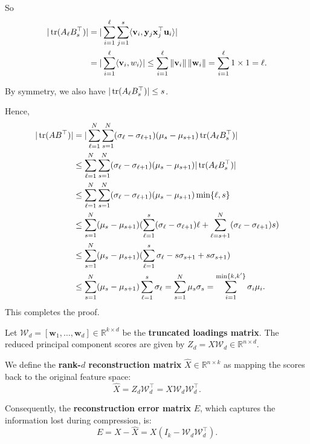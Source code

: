 \documentclass[12pt]{article}
\begin{document}
\begin{pfbox}
So
\begin{align*}
|\operatorname{tr}(A_\ell B_s^\top)|& = |\sum_{i=1}^{\ell}\sum_{j=1}^{s} \langle \mathbf{v}_i, \mathbf{y}_j\mathbf{x}_j^\top \mathbf{u}_i\rangle|\\
& = |\sum_{i=1}^{\ell}\langle \mathbf{v}_i, w_i\rangle|\le \sum_{i=1}^{\ell}\left\lVert \mathbf{v}_i \right\rVert\left\lVert \mathbf{w}_i \right\rVert=\sum_{i=1}^{\ell}1\times 1 = \ell.    
\end{align*}

By symmetry, we also have $|\operatorname{tr}(A_\ell B_s^\top)|\le s$.

Hence,
\begin{align*}
|\operatorname{tr}(AB^\top)|&=|\sum_{\ell=1}^{N}\sum_{s=1}^{N}(\sigma_\ell-\sigma_{\ell+1})(\mu_s-\mu_{s+1})\operatorname{tr}(A_\ell B_s^\top)|\\
&\le \sum_{\ell=1}^{N}\sum_{s=1}^{N}(\sigma_\ell-\sigma_{\ell+1})(\mu_s-\mu_{s+1})|\operatorname{tr}(A_\ell B^\top_s)|\\
&\le\sum_{\ell=1}^{N}\sum_{s=1}^{N}(\sigma_\ell-\sigma_{\ell+1})(\mu_s-\mu_{s+1})\min\{\ell,s\}\\
&\le \sum_{s=1}^{N}(\mu_s-\mu_{s+1})(\sum_{\ell=1}^{s}(\sigma_\ell-\sigma_{\ell+1})\ell + \sum_{\ell=s+1}^{N}(\sigma_\ell-\sigma_{\ell+1})s)\\
&\le \sum_{s=1}^{N}(\mu_s-\mu_{s+1})(\sum_{\ell=1}^{s}\sigma_\ell - s\sigma_{s+1} + s\sigma_{s+1})\\
&\le \sum_{s=1}^{N}(\mu_s-\mu_{s+1})\sum_{\ell=1}^{s}\sigma_\ell = \sum_{s=1}^{N}\mu_s\sigma_s = \sum_{i=1}^{\min\{k,k'\}}\sigma_i\mu_i.
\end{align*}
This completes the proof.
\end{pfbox}


Let $\mathcal{W}_d = [\mathbf{w}_1, \dots, \mathbf{w}_d] \in \mathbb{R}^{k \times d}$ be the \textbf{truncated loadings matrix}. The reduced principal component scores are given by $Z_d = X \mathcal{W}_d \in \mathbb{R}^{n \times d}$.

We define the \textbf{rank-$d$ reconstruction matrix} $\widehat{X}\in\mathbb{R}^{n\times k}$ as mapping the scores back to the original feature space:
\begin{equation}
\widehat{X} = Z_d \mathcal{W}_d^\top = X \mathcal{W}_d \mathcal{W}_d^\top.
\end{equation}

Consequently, the \textbf{reconstruction error matrix} $E$, which captures the information lost during compression, is:
\begin{equation}
E = X - \widehat{X} = X (I_k - \mathcal{W}_d \mathcal{W}_d^\top).
\end{equation}
\end{document}
